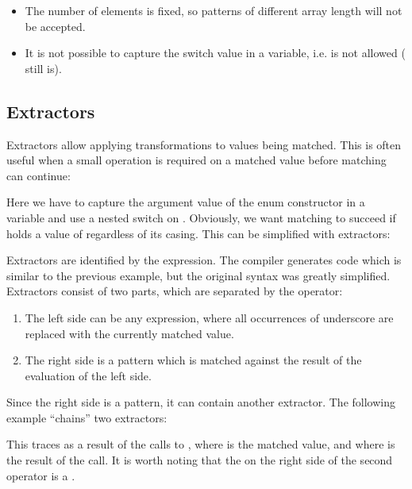\begin{itemize}
	\item The number of elements is fixed, so patterns of different array length will not be accepted.
	\item It is not possible to capture the switch value in a variable, i.e.  is not allowed ( still is).
\end{itemize}




\subsection{Extractors}
\label{lf-pattern-matching-extractors}

Extractors allow applying transformations to values being matched. This is often useful when a small operation is required on a matched value before matching can continue:


Here we have to capture the argument value of the  enum constructor in a variable  and use a nested switch on . Obviously, we want matching to succeed if  holds a value of  regardless of its casing. This can be simplified with extractors:


Extractors are identified by the  expression. The compiler generates code which is similar to the previous example, but the original syntax was greatly simplified. Extractors consist of two parts, which are separated by the \expr{=>} operator:

\begin{enumerate}
\item The left side can be any expression, where all occurrences of underscore \expr{_} are replaced with the currently matched value.
\item The right side is a pattern which is matched against the result of the evaluation of the left side.
\end{enumerate}

Since the right side is a pattern, it can contain another extractor. The following example ``chains'' two extractors:


This traces  as a result of the calls to , where  is the matched value, and  where  is the result of the  call. It is worth noting that the  on the right side of the second \expr{=>} operator is a .

